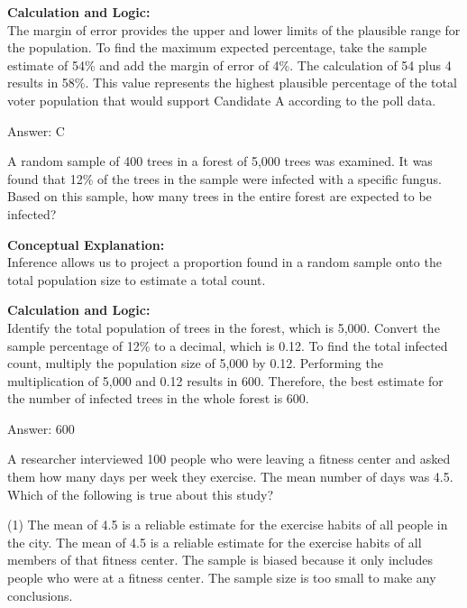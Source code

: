 \documentclass[11pt,paper=a4,answers]{exam}
\begin{document}
\begin{questions}
\begin{solution}
\textbf{Calculation and Logic:} \\
The margin of error provides the upper and lower limits of the plausible range for the population. To find the maximum expected percentage, take the sample estimate of 54\% and add the margin of error of 4\%. The calculation of 54 plus 4 results in 58\%. This value represents the highest plausible percentage of the total voter population that would support Candidate A according to the poll data.

\vspace{30pt}

Answer: \colorbox{yellow!100}{C}
\end{solution}

\vspace{60pt}

\question
A random sample of 400 trees in a forest of 5,000 trees was examined. It was found that 12\% of the trees in the sample were infected with a specific fungus. Based on this sample, how many trees in the entire forest are expected to be infected?

\begin{solution}
\textbf{Conceptual Explanation:} \\
Inference allows us to project a proportion found in a random sample onto the total population size to estimate a total count.

\vspace{30pt}

\textbf{Calculation and Logic:} \\
Identify the total population of trees in the forest, which is 5,000. Convert the sample percentage of 12\% to a decimal, which is 0.12. To find the total infected count, multiply the population size of 5,000 by 0.12. Performing the multiplication of 5,000 and 0.12 results in 600. Therefore, the best estimate for the number of infected trees in the whole forest is 600.

\vspace{30pt}

Answer: \colorbox{yellow!100}{600}
\end{solution}

\vspace{60pt}

\question
A researcher interviewed 100 people who were leaving a fitness center and asked them how many days per week they exercise. The mean number of days was 4.5. Which of the following is true about this study?
\begin{tasks}(1)
    \task The mean of 4.5 is a reliable estimate for the exercise habits of all people in the city.
    \task The mean of 4.5 is a reliable estimate for the exercise habits of all members of that fitness center.
    \task The sample is biased because it only includes people who were at a fitness center.
    \task The sample size is too small to make any conclusions.
\end{tasks}


\end{questions}
\end{document}
